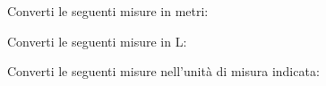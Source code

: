 \documentclass[12pt]{exam}
\begin{document}
\begin{questions}
\newpage
\question[15] Converti le seguenti misure in metri:
\noaddpoints %
\begin{multicols}{2}
\end{multicols}
\addpoints


\question[15] Converti le seguenti misure in L:
\noaddpoints %
\begin{multicols}{2}
\end{multicols}
\addpoints

\question[15] Converti le seguenti misure nell'unità di misura indicata:
\noaddpoints %
\begin{multicols}{2}
\end{multicols}
\end{questions}
\end{document}
